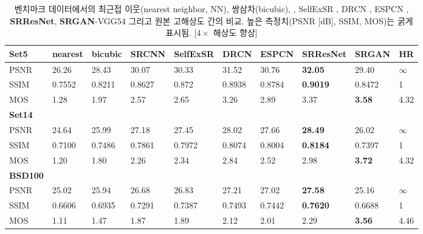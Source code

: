 \documentclass[10pt,twocolumn,letterpaper]{article}
\newcommand{\kor}[1]{#1}
\newcommand{\eng}[1]{}
\begin{document}
\begin{table}[htb!]
\centering
\caption{\eng{Comparison of NN, bicubic, SRCNN \cite{dong2014learning}, SelfExSR \cite{Huang15selfexemplars}, DRCN \cite{kim2016deeply}, ESPCN \cite{Shi2016ESPCN}, \textbf{SRResNet}, \textbf{SRGAN}-VGG54 and the original HR on benchmark data. Highest measures (PSNR [dB], SSIM, MOS) in bold. [$4\times$ upscaling]}\kor{벤치마크 데이터에서의 최근접 이웃(nearest neighbor, NN), 쌍삼차(bicubic), \cite{dong2014learning}, SelfExSR \cite{Huang15selfexemplars}, DRCN \cite{kim2016deeply}, ESPCN \cite{Shi2016ESPCN}, \textbf{SRResNet}, \textbf{SRGAN}-VGG54 그리고 원본 고해상도 간의 비교. 높은 측정치(PSNR [dB], SSIM, MOS)는 굵게 표시됨. [$4\times$ 해상도 향상]}}
\label{tab:performance}
\begin{adjustbox}{max width=0.8\textwidth}
\begin{tabular}{llllllllll}
\textbf{Set5} & nearest & bicubic & SRCNN & SelfExSR & DRCN & ESPCN & \textbf{SRResNet} & \textbf{SRGAN} & HR \\
\hline
PSNR & 26.26 & 28.43 & 30.07 & 30.33 & 31.52 & 30.76 & \textbf{32.05} & 29.40 & $\infty$ \\
SSIM & 0.7552 & 0.8211 & 0.8627 & 0.872 & 0.8938 & 0.8784 & \textbf{0.9019} & 0.8472 & 1 \\
MOS  & 1.28 & 1.97 & 2.57 & 2.65 & 3.26 & 2.89 & 3.37 & \textbf{3.58} & 4.32 \\ [0.3cm]

\textbf{Set14} & & & & & & & & \\
\hline
PSNR & 24.64 & 25.99 & 27.18 & 27.45 & 28.02 & 27.66 & \textbf{28.49} & 26.02 & $\infty$ \\
SSIM & 0.7100 & 0.7486 & 0.7861 & 0.7972 & 0.8074 & 0.8004 & \textbf{0.8184} & 0.7397 & 1 \\
MOS  & 1.20 & 1.80 & 2.26 & 2.34 & 2.84 & 2.52 & 2.98 & \textbf{3.72} & 4.32 \\ [0.3cm]
\textbf{BSD100} & & & & & & & &  \\
\hline
PSNR & 25.02 & 25.94 & 26.68 & 26.83 & 27.21 & 27.02 & \textbf{27.58} & 25.16 & $\infty$ \\
SSIM & 0.6606 & 0.6935 & 0.7291 & 0.7387 & 0.7493 & 0.7442 & \textbf{0.7620} & 0.6688 & 1 \\
MOS  & 1.11 & 1.47 & 1.87 & 1.89 & 2.12 & 2.01 & 2.29 & \textbf{3.56} & 4.46 \\
\end{tabular}
\end{adjustbox}
\end{table}
\end{document}
